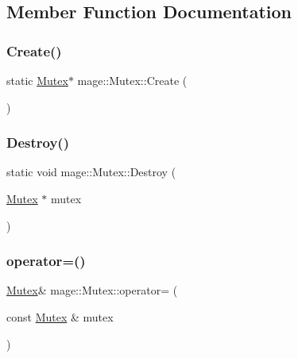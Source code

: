 \subsection{Member Function Documentation}
\hypertarget{classmage_1_1_mutex_a48d784fa6bffd4088d9f89a2a9cca84e}{}\label{classmage_1_1_mutex_a48d784fa6bffd4088d9f89a2a9cca84e} 
\subsubsection{\texorpdfstring{Create()}{Create()}}
{\footnotesize\ttfamily static \hyperlink{classmage_1_1_mutex}{Mutex}$\ast$ mage\+::\+Mutex\+::\+Create (\begin{DoxyParamCaption}{ }\end{DoxyParamCaption})\hspace{0.3cm}{\ttfamily [static]}}

\hypertarget{classmage_1_1_mutex_a78cd1aff434b1d7cefce4c8339c25d8f}{}\label{classmage_1_1_mutex_a78cd1aff434b1d7cefce4c8339c25d8f} 
\subsubsection{\texorpdfstring{Destroy()}{Destroy()}}
{\footnotesize\ttfamily static void mage\+::\+Mutex\+::\+Destroy (\begin{DoxyParamCaption}\item[{\hyperlink{classmage_1_1_mutex}{Mutex} $\ast$}]{mutex }\end{DoxyParamCaption})\hspace{0.3cm}{\ttfamily [static]}}

\hypertarget{classmage_1_1_mutex_aeaab2190729234e0da465ed0196111f0}{}\label{classmage_1_1_mutex_aeaab2190729234e0da465ed0196111f0} 
\subsubsection{\texorpdfstring{operator=()}{operator=()}}
{\footnotesize\ttfamily \hyperlink{classmage_1_1_mutex}{Mutex}\& mage\+::\+Mutex\+::operator= (\begin{DoxyParamCaption}\item[{const \hyperlink{classmage_1_1_mutex}{Mutex} \&}]{mutex }\end{DoxyParamCaption})\hspace{0.3cm}{\ttfamily [private]}}



